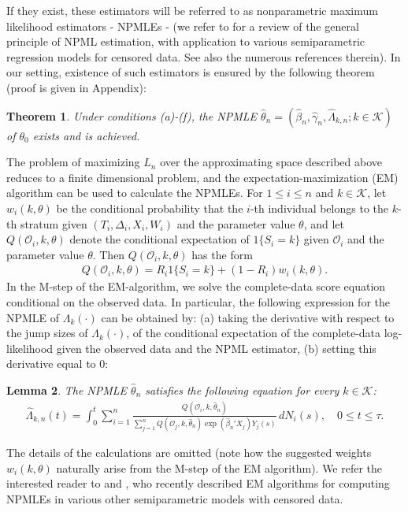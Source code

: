 \documentclass{statsoc}
\newtheorem{theorem}{Theorem}[section]
\newtheorem{lemma}[theorem]{Lemma}
\begin{document}
If they exist, these estimators will be referred to as nonparametric maximum likelihood estimators - NPMLEs - (we refer to \cite{zeng07} for a review of the general principle of NPML estimation, with application to various semiparametric regression models for censored data. See also the numerous references therein). In our setting, existence of such estimators is ensured by the following theorem (proof is given in Appendix):
\begin{theorem}\label{exist}
Under conditions (a)-(f), the NPMLE $\widehat\theta_n=(\widehat\beta_n, \widehat\gamma_n, \widehat\Lambda_{k,n}; k\in\mathcal K)$ of $\theta_0$ exists and is achieved.
\end{theorem}
The problem of maximizing $L_n$ over the approximating space described above reduces to a finite dimensional problem, and the expectation-maximization (EM) algorithm \citep{dlr} can be used to calculate the NPMLEs. For $1\leq i\leq n$ and $k\in\mathcal K$, let $w_i(k,\theta)$ be the conditional probability that the $i$-th individual belongs to the $k$-th stratum given $(T_i, \Delta_i, X_i, W_i)$ and the parameter value $\theta$, and let $Q(\mathcal O_i,k,\theta)$ denote the conditional expectation of $1\{S_i=k\}$ given $\mathcal O_i$ and the parameter value $\theta$. Then $Q(\mathcal O_i,k,\theta)$ has the form
\begin{eqnarray*}
Q(\mathcal O_i,k,\theta)=R_i1\{S_i=k\}+(1-R_i)w_i(k,\theta).
\end{eqnarray*}
In the M-step of the EM-algorithm, we solve the complete-data score equation conditional on the observed data. In particular, the following expression for the NPMLE of $\Lambda_k(\cdot)$ can be obtained by: (a) taking the derivative with respect to the jump sizes of $\Lambda_k(\cdot)$, of the conditional expectation of the complete-data log-likelihood given the observed data and the NPML estimator, (b) setting this derivative equal to 0:
\begin{lemma}
The NPMLE $\widehat\theta_n$ satisfies the following equation for every $k\in\mathcal K$:
\begin{eqnarray*}\label{npmleL}
\widehat\Lambda_{k,n}(t)=\int_0^t\sum_{i=1}^n \frac{Q(\mathcal O_i,k,\widehat\theta_n)}{\sum_{j=1}^n Q(\mathcal O_j,k,\widehat\theta_n)\exp(\widehat\beta_n'X_j)Y_j(s)}\,dN_i(s),\quad 0\leq t\leq \tau.
\end{eqnarray*}
\end{lemma}
The details of the calculations are omitted (note how the suggested weights $w_i(k,\theta)$ naturally arise from the M-step of the EM algorithm). We refer the interested reader to \cite{zengcai05} and \cite{sugi06}, who recently described EM algorithms for computing NPMLEs in various other semiparametric models with censored data.
\end{document}
